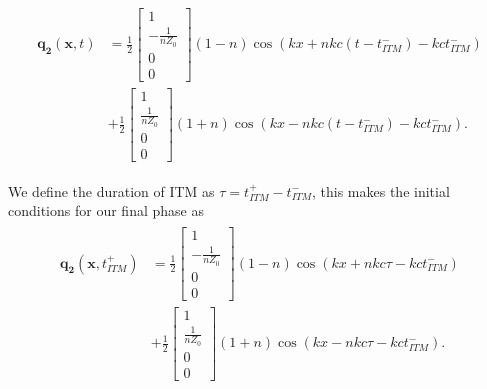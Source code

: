 \begin{align}
    \begin{split}
        \mathbf{q_2}\left(\mathbf{x}, t\right) &= 
        \frac{1}{2} \begin{bmatrix}
            1 \\
            -\frac{1}{nZ_0} \\
            0 \\
            0
        \end{bmatrix} \left(1 - n\right) \cos\left(kx +nk c \left(t - t_{ITM}^-\right) - k c t_{ITM}^-\right) \\ 
        &+ \frac{1}{2} 
        \begin{bmatrix}
            1 \\
            \frac{1}{nZ_0} \\
            0 \\
            0
        \end{bmatrix} \left(1 + n\right) \cos\left(kx - nk c \left(t - t_{ITM}^-\right) - k c t_{ITM}^-\right) .
    \end{split}
\end{align}

We define the duration of \ac{ITM} as $\tau = t_{ITM}^+ - t_{ITM}^-$, this makes the initial conditions for our final phase as
\begin{align}
    \begin{split}
        \mathbf{q_2}\left(\mathbf{x}, t_{ITM}^+\right) &= 
        \frac{1}{2} \begin{bmatrix}
            1 \\
            -\frac{1}{nZ_0} \\
            0 \\
            0
        \end{bmatrix} \left(1 - n\right) \cos\left(kx +nk c \tau - k c t_{ITM}^-\right) \\ 
        &+ \frac{1}{2} 
        \begin{bmatrix}
            1 \\
            \frac{1}{nZ_0} \\
            0 \\
            0
        \end{bmatrix} \left(1 + n\right) \cos\left(kx - nk c \tau - k c t_{ITM}^-\right) .
    \end{split}
    \label{eq:initphase3}
\end{align}

